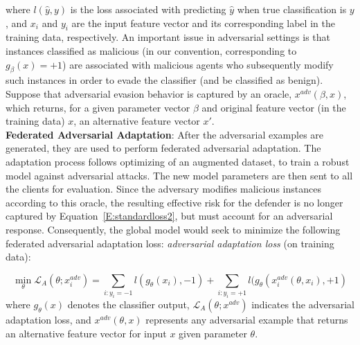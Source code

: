 where $l(\hat{y},y)$ is the loss associated with predicting $\hat{y}$ when true classification is $y$, and $x_i$ and $y_i$ are the input feature vector and its corresponding label in the training data, respectively.
An important issue in adversarial settings is that instances
classified as malicious (in our convention, corresponding to
$g_\beta(x) = +1$) are associated with malicious agents who
subsequently modify such instances in order to evade the classifier
(and be classified as benign).
Suppose that adversarial evasion behavior is captured by an oracle,
$x^{adv}(\beta, x)$, which returns, for a given parameter vector
$\beta$ and original feature vector (in the training data) $x$, an
alternative feature vector $x'$.
\\\textbf{Federated Adversarial Adaptation}: After the adversarial examples are generated,
they are used to perform federated adversarial adaptation. The adaptation process follows optimizing of an augmented dataset, to train a robust model against 
adversarial attacks. The new model parameters are then sent to all the 
clients for evaluation.  Since the adversary modifies malicious instances according to this
oracle, the resulting effective risk for the defender is no longer
captured by Equation~\ref{E:standardloss2}, but must account for
an adversarial response.
Consequently, the global model would seek to minimize the following federated adversarial adaptation loss:
\emph{adversarial adaptation loss} (on training data):

\begin{equation}
\label{E:advloss}
\min_\theta \mathcal{L}_A(\theta; x^{adv}_{i}) = \sum_{i:y_i = -1} l(g_\theta(x_i),-1)+ \sum_{i:y_i = +1} l(g_\theta(x^{adv}_{i}(\theta,x_i),+1) 
\end{equation}
where $g_\theta(x)$ denotes the classifier output, $\mathcal{L}_A(\theta;  x^{adv})$ indicates the adversarial adaptation loss, and $ x^{adv}(\theta,x)$ represents any adversarial example that returns an alternative feature vector for input $x$ given parameter $\theta$.


